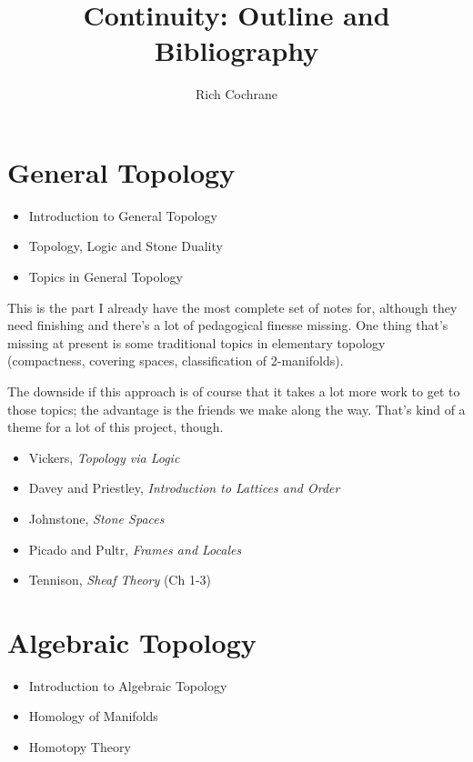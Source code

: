 \documentclass[article]{article}
\begin{document}
\title{Continuity: Outline and Bibliography}
\author{Rich Cochrane}
\maketitle

\section{General Topology}

\begin{itemize}
	\item{Introduction to General Topology}
	\item{Topology, Logic and Stone Duality}
	\item{Topics in General Topology}
\end{itemize}
This is the part I already have the most complete set of notes for, although they need finishing and there's a lot of pedagogical finesse missing. One thing that's missing at present is some traditional topics in elementary topology (compactness, covering spaces, classification of 2-manifolds). 

The downside if this approach is of course that it takes a lot more work to get to those topics; the advantage is the friends we make along the way. That's kind of a theme for a lot of this project, though.

\begin{itemize}
	\item[]{Vickers, \emph{Topology via Logic}}
	\item[]{Davey and Priestley, \textit{Introduction to Lattices and Order}}
	\item[]{Johnstone, \emph{Stone Spaces}}
	\item[]{Picado and Pultr, \emph{Frames and Locales}}
	\item[]{Tennison, \emph{Sheaf Theory} (Ch 1-3)}
\end{itemize}

\section{Algebraic Topology}

\begin{itemize}
	\item{Introduction to Algebraic Topology}
	\item{Homology of Manifolds}
	\item{Homotopy Theory}
\end{itemize}
\end{document}
